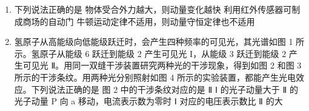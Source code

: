\documentclass[\gkver]{gaokaozhenti}
\begin{document}
\begin{enumerate}
{ $i=\theta$

过 D 点做出射光的平行线，则该平行线与 AB 的夹角为  $\theta$，由几何知识可知，入射光与出射光的夹角为  $90^{\circ}$。

故选 A。


14\. 下列说法正确的是（）

A. 利用电容传感器可制成麦克风

B．物体受合外力越大，则动量变化越快

C．利用红外传感器可制成商场的自动门

D．牛顿运动定律不适用，则动量守恒定律也不适用

【详解】A．声音使振动膜片振动，改变两极板间距离，使声音信号转换成电信号，则可以利用电容传感器可制成麦克风，故 A 正确；

B．由动量定理有  $F_{\text{合}}t = \Delta p$ 可得  $F_{\text{合}} = \frac{\Delta p}{t}$

可知，物体受合外力越大，则动量变化越快，故 B 正确；

C．人体可以向外界释放红外线，感应装置接收到红外线后，可以开门，则可以利用红外传感器可制成商场的自动门，故 C 正确；

D．牛顿运动定律只适用于宏观低速问题，不适用于微观高速问题。而动量守恒定律既适用于低速宏观问题，也适用于高速微观问题，故 D 错误。

故选 ABC。
}

\item
下列说法正确的是
{物体受合外力越大，则动量变化越快}
{利用红外传感器可制成商场的自动门}
{牛顿运动定律不适用，则动量守恒定律也不适用}

\item
氢原子从高能级向低能级跃迁时，会产生四种频率的可见光，其光谱如图 1 所示。氢原子从能级 6 跃迁到能级 2 产生可见光 I，从能级 3 跃迁到能级 2 产生可见光 Ⅱ。用同一双缝干涉装置研究两种光的干涉现象，得到如图 2 和图 3 所示的干涉条纹。用两种光分别照射如图 4 所示的实验装置，都能产生光电效应。下列说法正确的是
{图 2 中的干涉条纹对应的是 Ⅱ}
{Ⅰ 的光子动量大于 Ⅱ 的光子动量}
{P 向 a 移动，电流表示数为零时 Ⅰ 对应的电压表示数比 Ⅱ 的大}
\end{enumerate}
\end{document}
